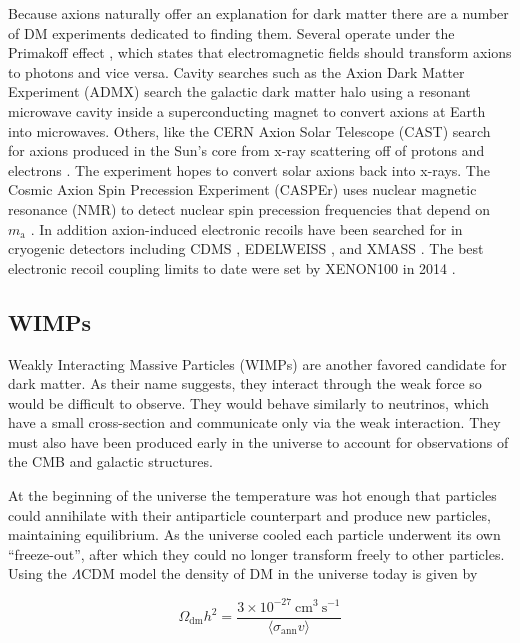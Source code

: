 
Because axions naturally offer an explanation for dark matter there are a number of DM experiments dedicated to
finding them.  Several operate under the Primakoff effect , which states that electromagnetic fields should
transform
axions to photons and vice versa.  Cavity searches such as the Axion Dark Matter Experiment (ADMX)  search the galactic
dark matter halo using a resonant microwave cavity inside a superconducting magnet
to convert axions at Earth into microwaves.  Others, like the CERN Axion Solar Telescope (CAST) search for axions produced in the Sun's
core from x-ray scattering off of protons and electrons .  The experiment hopes to convert solar axions back into
x-rays.  The Cosmic Axion
Spin Precession Experiment (CASPEr) uses nuclear magnetic resonance (NMR) to detect nuclear spin precession frequencies that depend on
$m_{\mathrm{a}}$ .  In addition axion-induced electronic recoils have been searched for in cryogenic detectors
including CDMS , EDELWEISS , and XMASS .  The best electronic recoil coupling
limits to date were set by XENON100 in 2014 .


\subsection{WIMPs} \label{subsec:wimps}
Weakly Interacting Massive Particles (WIMPs) are another favored candidate for dark matter.  As their name
suggests, they interact through the weak force so would be difficult to observe.  They
would behave similarly to neutrinos, which have a small cross-section and communicate only via the weak interaction.  They must also have
been produced early in the universe to account for observations of the CMB and galactic structures.

At the beginning of the universe the temperature was hot enough that particles could annihilate with their
antiparticle counterpart and produce new particles, maintaining equilibrium.  As the universe cooled each
particle underwent its own ``freeze-out'', after which they could no longer transform freely to other particles.  Using the
$\Lambda$CDM model the density of DM in the universe today is given by

\begin{equation}
\Omega_{\mathrm{dm}}h^{2} = \frac{3 \times 10^{-27}\ \mathrm{cm^{3}\ s^{-1}}}{\langle \sigma_{\mathrm{ann}} v \rangle}
\end{equation}

